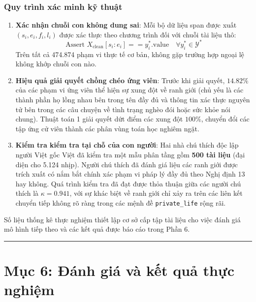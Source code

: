\documentclass[
  11pt,
  a4paper,
]{article}
\providecommand{\tightlist}{%
  \setlength{\itemsep}{0pt}\setlength{\parskip}{0pt}}
\begin{document}
\subsubsection{Quy trình xác minh kỹ
thuật}\label{quy-truxecnh-xuxe1c-minh-kux1ef9-thuux1eadt}

\begin{enumerate}
\def\labelenumi{\arabic{enumi}.}
\tightlist
\item
  \textbf{Xác nhận chuỗi con không dung sai}: Mỗi bộ dữ liệu span được
  xuất \((s_i, e_i, f_i, l_i)\) được xác thực theo chương trình đối với
  chuỗi tài liệu thô:
  \[\text{Assert } X_{\text{clean}}[s_i : e_i] == y_i^*.\text{value} \quad \forall y_i^* \in \mathcal{Y}^*\]
  Trên tất cả 474.874 phạm vi thực tế cơ bản, không gặp trường hợp ngoại
  lệ không khớp chuỗi con nào.
\item
  \textbf{Hiệu quả giải quyết chồng chéo ứng viên}: Trước khi giải
  quyết, \(14.82\%\) của các phạm vi ứng viên thể hiện sự xung đột về
  ranh giới (chủ yếu là các thành phần họ lồng nhau bên trong tên đầy đủ
  và thông tin xác thực nguyên tử bên trong các câu chuyện về tình trạng
  nghèo đói hoặc sức khỏe nói chung). Thuật toán 1 giải quyết dứt điểm
  các xung đột \(100\%\), chuyển đổi các tập ứng cử viên thành các phân
  vùng toán học nghiêm ngặt.
\item
  \textbf{Kiểm tra kiểm tra tại chỗ của con người}: Hai nhà chú thích
  độc lập người Việt gốc Việt đã kiểm tra một mẫu phân tầng gồm
  \textbf{500 tài liệu} (đại diện cho 5.124 nhịp). Người chú thích đã
  đánh giá liệu các ranh giới được trích xuất có nắm bắt chính xác phạm
  vi pháp lý đầy đủ theo Nghị định 13 hay không. Quá trình kiểm tra đã
  đạt được thỏa thuận giữa các người chú thích là
  \textbf{\(\kappa = 0.941\)}, với sự khác biệt về ranh giới chỉ xảy ra
  trên các liên kết chuyển tiếp không rõ ràng trong các mệnh đề
  \texttt{private\_life} rộng rãi.
\end{enumerate}

Số liệu thống kê thực nghiệm thiết lập cơ sở cấp tập tài liệu cho việc
đánh giá mô hình tiếp theo và các kết quả được báo cáo trong Phần 6.

\begin{center}\rule{0.5\linewidth}{0.5pt}\end{center}

\section{Mục 6: Đánh giá và kết quả thực
nghiệm}\label{mux1ee5c-6-ux111uxe1nh-giuxe1-vuxe0-kux1ebft-quux1ea3-thux1ef1c-nghiux1ec7m}
\end{document}

